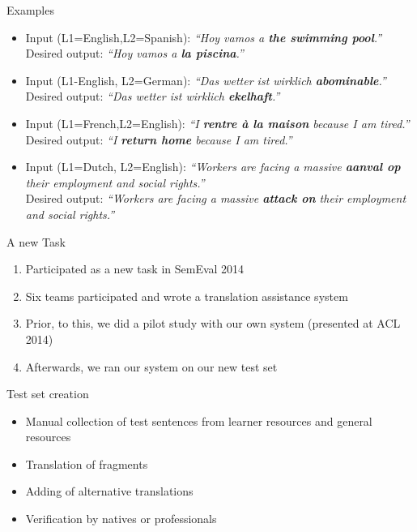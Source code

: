 \documentclass[compress]{beamer}
\begin{document}
\begin{frame}{Examples}

{\footnotesize
  \begin{itemize}
    \item 
      Input (L1=English,L2=Spanish): \emph{“Hoy vamos a \textbf{the swimming
      pool}.”} \\
      Desired output: \emph{“Hoy vamos a \textbf{la piscina}.”}
    \item
      Input (L1-English, L2=German): \emph{“Das wetter ist wirklich
      \textbf{abominable}.”} \\
      Desired output: \emph{“Das wetter ist wirklich \textbf{ekelhaft}.”}
    \item
      Input (L1=French,L2=English): \emph{“I \textbf{rentre \`a la maison} because
      I am tired.”} \\
      Desired output: \emph{“I \textbf{return home} because I am tired.”}
    \item
      Input (L1=Dutch, L2=English): \emph{“Workers are facing a massive \textbf{aanval
      op} their employment and social rights.”} \\
      Desired output: \emph{“Workers are facing a massive \textbf{attack on}
      their employment and social rights.”}
  \end{itemize}
}

\end{frame}


\begin{frame}
  \begin{block}{A new Task}

    \begin{enumerate}
      \item Participated as a new task in SemEval 2014
      \item Six teams participated and wrote a translation assistance system
      \item Prior, to this, we did a pilot study with our own system (presented at ACL 2014)
      \item Afterwards, we ran our system on our new test set
    \end{enumerate}
  \end{block}

  \begin{block}{Test set creation}
    \begin{itemize}
      \item Manual collection of test sentences from learner resources and
        general resources
      \item Translation of fragments
      \item Adding of alternative translations
      \item Verification by natives or professionals
    \end{itemize}
  \end{block}
\end{frame}
\end{document}
